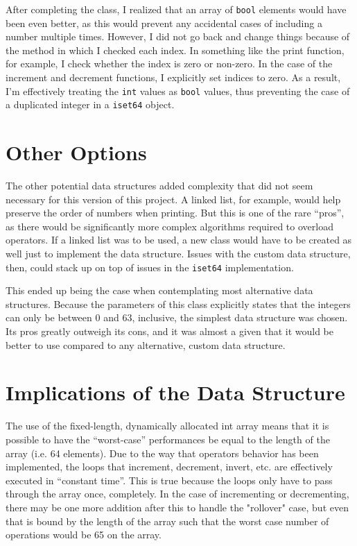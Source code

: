 \documentclass[12pt, letterpaper]{article}
\begin{document}
After completing the class, I realized that an array of \texttt{bool} elements would have been even better, as this would prevent any accidental cases of including a number multiple times. However, I did not go back and change things because of the method in which I checked each index. In something like the print function, for example, I check whether the index is zero or non-zero. In the case of the increment and decrement functions, I explicitly set indices to zero. As a result, I'm effectively treating the \texttt{int} values as \texttt{bool} values, thus preventing the case of a duplicated integer in a \texttt{iset64} object.

\section{Other Options}
The other potential data structures added complexity that did not seem necessary for this version of this project. A linked list, for example, would help preserve the order of numbers when printing. But this is one of the rare ``pros'', as there would be significantly more complex algorithms required to overload operators. If a linked list was to be used, a new class would have to be created as well just to implement the data structure. Issues with the custom data structure, then, could stack up on top of issues in the \texttt{iset64} implementation.

This ended up being the case when contemplating most alternative data structures. Because the parameters of this class explicitly states that the integers can only be between 0 and 63, inclusive, the simplest data structure was chosen. Its pros greatly outweigh its cons, and it was almost a given that it would be better to use compared to any alternative, custom data structure.

\section{Implications of the Data Structure}
The use of the fixed-length, dynamically allocated int array means that it is possible to have the ``worst-case'' performances be equal to the length of the array (i.e. 64 elements). Due to the way that operators behavior has been implemented, the loops that increment, decrement, invert, etc. are effectively executed in ``constant time''. This is true because the loops only have to pass through the array once, completely. In the case of incrementing or decrementing, there may be one more addition after this to handle the "rollover" case, but even that is bound by the length of the array such that the worst case number of operations would be 65 on the array.
\end{document}
